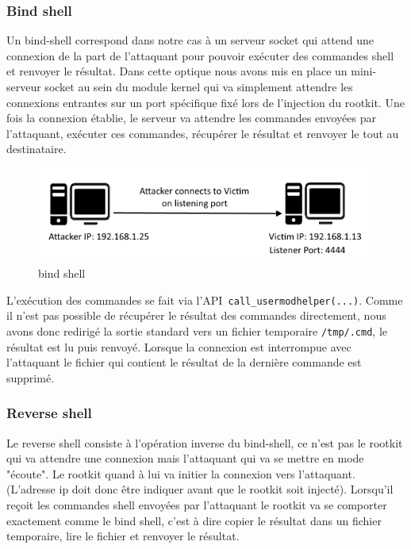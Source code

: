 \documentclass[11pt]{article}
\begin{document}
        \subsubsection{Bind shell}
            
            Un bind-shell correspond dans notre cas à un serveur socket qui attend une connexion de la part de l'attaquant pour pouvoir exécuter des commandes shell et renvoyer le résultat. Dans cette optique nous avons mis en place un mini-serveur socket au sein du module kernel qui va simplement attendre les connexions entrantes sur un port spécifique fixé lors de l'injection du rootkit. Une fois la connexion établie, le serveur va attendre les commandes envoyées par l'attaquant, exécuter ces commandes, récupérer le résultat et renvoyer le tout au destinataire. 
            
\begin{figure}[H] 
\begin{center}
\includegraphics{./img/bind-shell.png}

\caption[dsfsdf]{bind shell}
\end{center}
\end{figure}
            
            L'exécution des commandes se fait via l'API\texttt{ call\_usermodhelper(...)}. Comme il n'est pas possible de récupérer le résultat des commandes directement, nous avons donc redirigé la sortie standard vers un fichier temporaire \texttt{/tmp/.cmd}, le résultat est lu puis renvoyé. Lorsque la connexion est interrompue avec l'attaquant le fichier qui contient le résultat de la dernière commande est supprimé.
            
        \subsubsection{Reverse shell}
            
            Le reverse shell consiste à l'opération inverse du bind-shell, ce n'est pas le rootkit qui va attendre une connexion mais l'attaquant qui va se mettre en mode "écoute". Le rootkit quand à lui va initier la connexion vers l'attaquant. (L'adresse ip doit donc être indiquer avant que le rootkit soit injecté). Lorsqu'il reçoit les commandes shell envoyées par l'attaquant le rootkit va se comporter exactement comme le bind shell, c'est à dire copier le résultat dans un fichier temporaire, lire le fichier et renvoyer le résultat.
            
\end{document}
